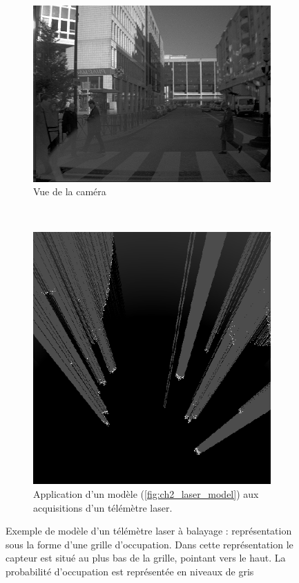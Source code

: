 \begin{figure}[h]
	\begin{center}
		\begin{subfigure}{0.48\textwidth}
			\includegraphics[width=\textwidth]{Chapter2/graphics/laser_occupancy_grid_pict.png} 
			\caption{Vue de la caméra}
		\end{subfigure}	
		~	
		\begin{subfigure}{0.48\textwidth}
			\includegraphics[width=\textwidth]{Chapter2/graphics/laser_occupancy_grid.png} 
			\caption{Application d'un modèle (\ref{fig:ch2_laser_model}) aux acquisitions d'un télémètre laser.}
		\end{subfigure}
		
		\caption{Exemple de modèle d'un télémètre laser à balayage : représentation sous la forme d'une grille d'occupation. Dans cette représentation le capteur est situé au plus bas de la grille, pointant vers le haut. La probabilité d'occupation est représentée en niveaux de gris}
		\label{fig:ch2_laser_grid}
	\end{center}
\end{figure}


